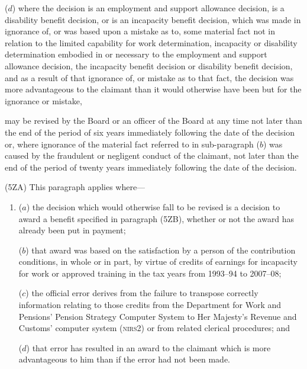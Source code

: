 \documentclass[12pt,a4paper]{article}
\begin{document}
\begin{enumerate}
($d$) where the decision 
is an employment and support allowance decision,  %
is a disability benefit decision, or is an incapacity benefit decision, which was made in ignorance of, or was based upon a mistake as to, some material fact not in relation to the 
limited capability for work determination,  %
incapacity or disability determination embodied in or necessary to 
the employment and support allowance decision,  %
the incapacity benefit decision or disability benefit decision, and as a result of that ignorance of, or mistake as to that fact, the decision was more advantageous to the claimant than it would otherwise have been but for the ignorance or mistake,
\end{enumerate}
may be revised 
by the Board or an officer of the Board at any time not later than the end of the period of six years immediately following the date of the decision or, where ignorance of the material fact referred to in sub-paragraph ($b$)  was caused by the fraudulent or negligent conduct of the claimant, not later than the end of the period of twenty years immediately following the date of the decision.  %

(5ZA) This paragraph applies where—
\begin{enumerate}\item[]
($a$) the decision which would otherwise fall to be revised is a decision to award a benefit specified in paragraph (5ZB), whether or not the award has already been put in payment;

($b$) that award was based on the satisfaction by a person of the contribution conditions, in whole or in part, by virtue of credits of earnings for incapacity for work or approved training in the tax years from 1993--94 to 2007--08;

($c$) the official error derives from the failure to transpose correctly information relating to those credits from the Department for Work and Pensions’ Pension Strategy Computer System to Her Majesty’s Revenue and Customs’ computer system (\textsc{\lowercase{NIRS2}}) or from related clerical procedures; and

($d$) that error has resulted in an award to the claimant which is more advantageous to him than if the error had not been made.
\end{enumerate}
\end{document}

